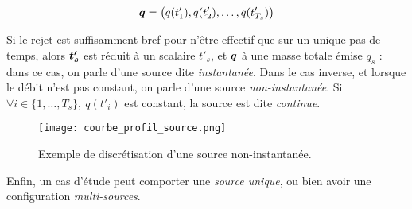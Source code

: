 	$$ {\bm{q}} = \left(q(t'_1), q(t'_2), \dots, q(t'_{T_s})\right)$$
	
	Si le rejet est suffisamment bref pour n'être effectif que sur un unique pas de temps, alors ${\bm{t'_s}}$ est réduit à un scalaire $t'_s$, et ${\bm{q}}$ à une masse totale émise $q_s$ : dans ce cas, on parle d'une source dite \textit{instantanée}. Dans le cas inverse, et lorsque le débit n'est pas constant, on parle d'une source \textit{non-instantanée}. Si $ \forall i \in \{1, \dots, T_s\}, ~ q(t'_i)$ est constant, la source est dite \textit{continue}. \\
	
	
	\begin{figure}[hb]
		\centering
		\texttt{[image: courbe\_profil\_source.png]}
		\caption{Exemple de discrétisation d'une source non-instantanée.}
		\label{fig_courbe_profil_source}
	\end{figure}
	
	Enfin, un cas d'étude peut comporter une \textit{source unique}, ou bien avoir une configuration \textit{multi-sources}.\\
	
